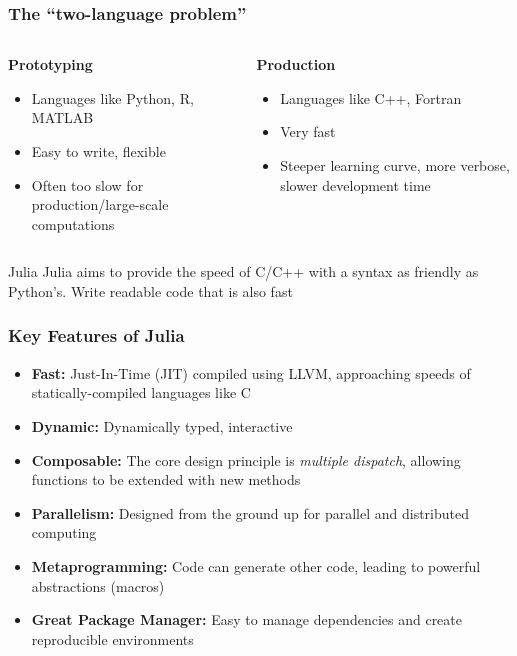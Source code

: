 \documentclass[aspectratio=169]{beamer}\usepackage[]{graphicx}\usepackage[]{xcolor}
\begin{document}
\begin{frame}
  \frametitle{The ``two-language problem''}
  \begin{columns}[T]
    \begin{column}{.5\textwidth}
      \textbf{Prototyping}
      \begin{itemize}
        \item Languages like Python, R, MATLAB
        \item Easy to write, flexible
        \item Often too slow for production/large-scale computations
      \end{itemize}
    \end{column}
    \begin{column}{.5\textwidth}
      \textbf{Production}
      \begin{itemize}
        \item Languages like C++, Fortran
        \item Very fast
        \item Steeper learning curve, more verbose, slower development time
      \end{itemize}
    \end{column}
  \end{columns}
  \vfill
  \begin{exampleblock}{Julia}
    Julia aims to provide the speed of C/C++ with a syntax as friendly as Python's. Write readable code that is also fast
  \end{exampleblock}
\end{frame}

\begin{frame}
  \frametitle{Key Features of Julia}
  \begin{itemize}
    \item \textbf{Fast:} Just-In-Time (JIT) compiled using LLVM, approaching speeds of statically-compiled languages like C
    \vfill
    \item \textbf{Dynamic:} Dynamically typed, interactive
    \vfill
    \item \textbf{Composable:} The core design principle is \textit{multiple dispatch}, allowing functions to be extended with new methods
    \vfill
    \item \textbf{Parallelism:} Designed from the ground up for parallel and distributed computing
    \vfill
    \item \textbf{Metaprogramming:} Code can generate other code, leading to powerful abstractions (macros)
    \vfill
    \item \textbf{Great Package Manager:} Easy to manage dependencies and create reproducible environments
  \end{itemize}
\end{frame}
\end{document}
